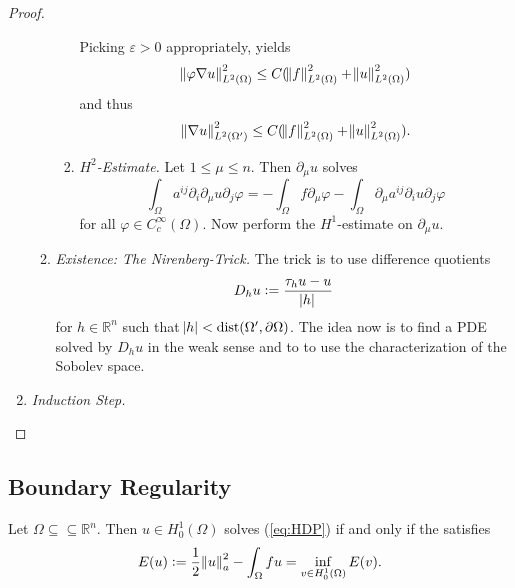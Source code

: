 \begin{proof}
\begin{enumerate}[label = \emph{Step \arabic*:}, wide = 0pt]
\begin{enumerate}[label = \textup{(}\alph*\textup{)},wide = 0pt]
\begin{enumerate}[label = \textup{(}\roman*\textup{)}]
\begin{equation*}
						\end{equation*}
						Picking $\varepsilon > 0$ appropriately, yields
						\begin{equation*}
							\norm[0]{\varphi\nabla u}_{L^2(\Omega)}^2 \leq  C(\norm{f}_{L^2(\Omega)}^2 + \norm{u}_{L^2(\Omega)}^2)
						\end{equation*}
						\noindent and thus
						\begin{equation*}
							\norm[0]{\nabla u}_{L^2(\Omega')}^2 \leq C(\norm{f}_{L^2(\Omega)}^2 + \norm{u}_{L^2(\Omega)}^2).
						\end{equation*}
					\item \emph{$H^2$-Estimate.} Let $1 \leq \mu \leq n$. Then $\partial_\mu u$ solves
						\begin{equation*}
							\int_\Omega a^{ij}\partial_i\partial_\mu u\partial_j\varphi = - \int_\Omega f\partial_\mu \varphi - \int_\Omega \partial_\mu a^{ij}\partial_i u\partial_j \varphi
						\end{equation*}
						\noindent for all $\varphi \in C^\infty_c(\Omega)$. Now perform the $H^1$-estimate on $\partial_\mu u$. 
				\end{enumerate}
			\item \emph{Existence: The Nirenberg-Trick.} The trick is to use difference quotients
				\begin{equation*}
					D_hu := \frac{\tau_hu - u}{\abs{h}}
				\end{equation*}
				\noindent for $h \in \mathbb{R}^n$ such that $\abs{h} < \operatorname{dist}(\Omega',\partial \Omega)$. The idea now is to find a PDE solved by $D_h u$ in the weak sense and to to use the characterization of the Sobolev space.
			\end{enumerate}
		\item \emph{Induction Step.}
	\end{enumerate}
\end{proof}

\subsection*{Boundary Regularity}

\begin{proposition}
	Let $\Omega \subseteq \subseteq \mathbb{R}^n$. Then $u \in H^1_0(\Omega)$ solves (\ref{eq:HDP}) if and only if the  satisfies
	\begin{equation*}
		E(u) := \frac{1}{2}\norm{u}^2_a - \int_\Omega fu = \inf_{v \in H^1_0(\Omega)} E(v).
	\end{equation*}
\end{proposition}

